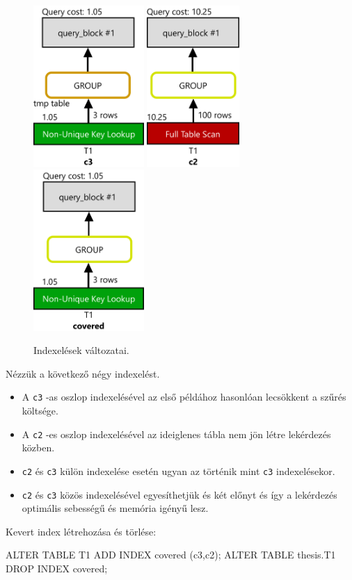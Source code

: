 \begin{figure}[h!]
\centering
\includegraphics[width=4.2cm]{images/explain/2-4.png}
\hspace{1cm} 
\includegraphics[width=3.51cm]{images/explain/2-2.png}
\hspace{1cm} 
\includegraphics[width=4.2cm]{images/explain/covered.png}
\caption{Indexelések változatai.}
\label{fig:schema}
\end{figure}

Nézzük a következő négy indexelést.
\begin{itemize} 
\item A \texttt{c3} -as oszlop indexelésével az első példához hasonlóan lecsökkent a szűrés költsége.
\item A \texttt{c2} -es oszlop indexelésével az ideiglenes tábla nem jön létre lekérdezés közben.
\item \texttt{c2} és \texttt{c3} külön indexelése esetén ugyan az történik mint \texttt{c3} indexelésekor.
\item \texttt{c2} és \texttt{c3} közös indexelésével egyesíthetjük és két előnyt és így a lekérdezés optimális sebességű és memória igényű lesz.
\end{itemize} 
Kevert index létrehozása és törlése:
\begin{python}
ALTER TABLE T1 ADD INDEX covered (c3,c2);
ALTER TABLE thesis.T1 DROP INDEX covered;
\end{python}

